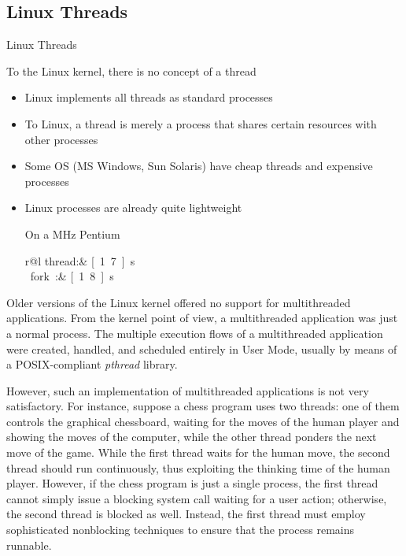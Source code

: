 \subsection{Linux Threads}
\label{sec:linux-threads}

\begin{frame}{Linux Threads}
  \begin{block}{To the Linux kernel, there is no concept of a thread}
    \begin{itemize}
    \item Linux implements all threads as standard processes
    \item To Linux, a thread is merely a process that shares certain resources with other
      processes
    \item Some OS (MS Windows, Sun Solaris) have cheap threads and expensive processes
    \item Linux processes are already quite lightweight\par
      On a \unit[75]{MHz} Pentium
      \begin{tblr}{r@{\;}l}
        thread:& \unit[1.7]{\mu{}s}\\
        fork:& \unit[1.8]{\mu{}s}
      \end{tblr}
    \end{itemize}
  \end{block}
\end{frame}


 Older versions of the Linux kernel offered no support
for multithreaded applications. From the kernel point of view, a multithreaded application
was just a normal process. The multiple execution flows of a multithreaded application
were created, handled, and scheduled entirely in User Mode, usually by means of a
POSIX-compliant \emph{pthread} library.

However, such an implementation of multithreaded applications is not very
satisfactory. For instance, suppose a chess program uses two threads: one of them controls
the graphical chessboard, waiting for the moves of the human player and showing the moves
of the computer, while the other thread ponders the next move of the game. While the first
thread waits for the human move, the second thread should run continuously, thus
exploiting the thinking time of the human player. However, if the chess program is just a
single process, the first thread cannot simply issue a blocking system call waiting for a
user action; otherwise, the second thread is blocked as well. Instead, the first thread
must employ sophisticated nonblocking techniques to ensure that the process remains
runnable.

